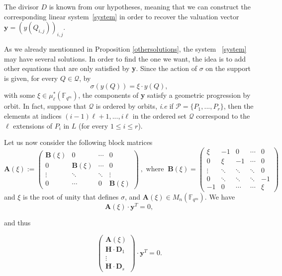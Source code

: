 \documentclass[10pt]{article}
\theoremstyle{definition}
\theoremstyle{definition}
\theoremstyle{definition}
\newcommand{\cd}{\cdot}
\newcommand{\Fqm}{\mathbb{F}_{q^m}}
\newcommand{\PR}{\mathcal{P}}
\newcommand{\QR}{\mathcal{Q}}
\begin{document}
The divisor $D$  is known from our hypotheses, meaning that we can construct the corresponding linear system~\eqref{system} in order to recover the valuation vector $\mathbf{y} = (y(Q_{i,j}))_{i,j}$.

As we already mentionned in Proposition \ref{othersolutions}, the system ~\eqref{system} may have several solutions. In order to find the one we want, the idea is to add other equations that are only satisfied by \textbf{y}. Since the action of $\sigma$ on the support is given, for every $Q \in \QR$,  by 
\[ \sigma(y(Q)) = \xi \cd y(Q),\]
with some $\xi \in \mu_{\ell}^*(\mathbb{F}_{q^m})$, the components of \textbf{y} satisfy a geometric progression by orbit. In fact, suppose that $\QR$ is ordered by orbits, \emph{i.e} if $\PR = \{P_1,...,P_r\}$, then the elements at indices $(i-1)\ell+1,...,i\ell$ in the ordered set $\QR$ correspond to the $\ell$ extensions of $P_{i}$ in $L$ (for every $1\leq i \leq r$).

Let us now consider the following block matrices
\begin{equation*} 
\mathbf{A}(\xi) := 
\begin{pmatrix}
\mathbf{B}(\xi) & 0 & \cdots & 0 \\
0 & \mathbf{B}(\xi) & \cdots & 0 \\
\vdots & \ddots & \ddots & \vdots \\
0 & \cdots & 0 & \mathbf{B}(\xi)
\end{pmatrix} \ , \textrm{ where }\ 
\mathbf{B}(\xi) = 
\begin{pmatrix}
\xi & -1 & 0 & \cdots & 0 \\
0 & \xi & -1 & \cdots & 0 \\
\vdots & \ddots & \ddots & \ddots & 0 \\
0 & \ddots & \ddots & \ddots & -1 \\
-1 & 0 & \cdots & \cdots & \xi
\end{pmatrix}
\end{equation*}
and $\xi$ is the root of unity that defines $\sigma$, and $\mathbf{A}(\xi) \in M_{n}(\Fqm)$. We have
\begin{equation*}
\mathbf{A}(\xi) \cd \textbf{y}^T
= 0,
\end{equation*}

and thus

\begin{equation} \label{system kummer}
\begin{pmatrix}
\mathbf{A}(\xi) \\
\mathbf{H} \cd \mathbf{D}_1 \\
\vdots \\
\mathbf{H} \cd \mathbf{D}_s
\end{pmatrix}
\cd \mathbf{y}^T = 0.
\end{equation}
\end{document}
